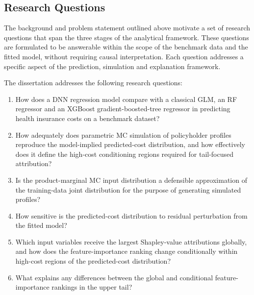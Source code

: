 
\subsection{Research Questions}
\label{sec:research_questions}

The background and problem statement outlined above motivate a set of
research questions that span the three stages of the analytical
framework.  These questions are formulated to be answerable within the
scope of the benchmark data and the fitted model, without requiring
causal interpretation.  Each question addresses a specific aspect of the
prediction, simulation and explanation framework.

The dissertation addresses the following research questions:

\begin{enumerate}
    \item \label{rq:1} How does a DNN regression model compare with a
          classical GLM, an RF regressor and an
          XGBoost gradient-boosted-tree regressor in predicting health
          insurance costs on a benchmark dataset?

    \item \label{rq:2} How adequately does parametric MC simulation of
          policyholder profiles reproduce the model-implied predicted-cost
          distribution, and how effectively does it define the high-cost
          conditioning regions required for tail-focused attribution?

    \item \label{rq:3} Is the product-marginal MC input distribution a
          defensible approximation of the training-data joint distribution
          for the purpose of generating simulated profiles?

    \item \label{rq:4} How sensitive is the predicted-cost distribution to
          residual perturbation from the fitted model?

    \item \label{rq:5} Which input variables receive the largest Shapley-value
          attributions globally, and how does the feature-importance
          ranking change conditionally within high-cost regions of the
          predicted-cost distribution?

    \item \label{rq:6} What explains any differences between the global and
          conditional feature-importance rankings in the upper tail?
\end{enumerate}

